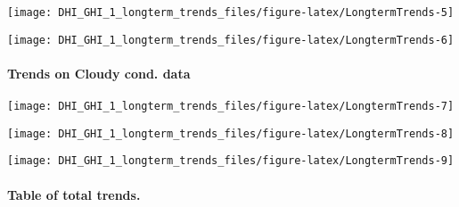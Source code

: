 \documentclass[
  10pt,
  a4paper,oneside]{article}
\begin{document}
\begin{center}\texttt{[image: DHI\_GHI\_1\_longterm\_trends\_files/figure-latex/LongtermTrends-5]} \end{center}

\begin{center}\texttt{[image: DHI\_GHI\_1\_longterm\_trends\_files/figure-latex/LongtermTrends-6]} \end{center}

\newpage

\hypertarget{trends-on-cloudy-cond.-data}{%
\paragraph{Trends on Cloudy cond. data}\label{trends-on-cloudy-cond.-data}}

\begin{center}\texttt{[image: DHI\_GHI\_1\_longterm\_trends\_files/figure-latex/LongtermTrends-7]} \end{center}

\begin{center}\texttt{[image: DHI\_GHI\_1\_longterm\_trends\_files/figure-latex/LongtermTrends-8]} \end{center}

\begin{center}\texttt{[image: DHI\_GHI\_1\_longterm\_trends\_files/figure-latex/LongtermTrends-9]} \end{center}

\newpage

\hypertarget{table-of-total-trends.}{%
\paragraph{Table of total trends.}\label{table-of-total-trends.}}

\scriptsize
\end{document}
